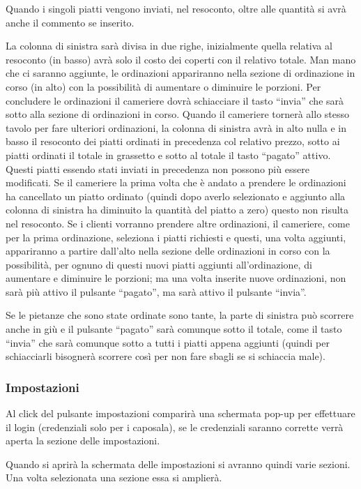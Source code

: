 \documentclass[12pt, letterpaper]{book}
\begin{document}
Quando i singoli piatti vengono inviati, nel resoconto, oltre alle quantità si avrà anche il commento se inserito.

La colonna di sinistra sarà divisa in due righe, inizialmente quella relativa al resoconto (in basso) avrà solo il costo dei coperti con il relativo totale. Man mano che ci saranno aggiunte, le ordinazioni appariranno nella sezione di ordinazione in corso (in alto) con la possibilità di aumentare o diminuire le porzioni. Per concludere le ordinazioni il cameriere dovrà schiacciare il tasto “invia” che sarà sotto alla sezione di ordinazioni in corso. Quando il cameriere tornerà allo stesso tavolo per fare ulteriori ordinazioni, la colonna di sinistra avrà in alto nulla e in basso il resoconto dei piatti ordinati in precedenza col relativo prezzo, sotto ai piatti ordinati il totale in grassetto e sotto al totale il tasto “pagato” attivo. Questi piatti essendo stati inviati in precedenza non possono più essere modificati. Se il cameriere la prima volta che è andato a prendere le ordinazioni ha cancellato un piatto ordinato (quindi dopo averlo selezionato e aggiunto alla colonna di sinistra ha diminuito la quantità del piatto a zero) questo non risulta nel resoconto. Se i clienti vorranno prendere altre ordinazioni, il cameriere, come per la prima ordinazione, seleziona i piatti richiesti e questi, una volta aggiunti, appariranno a partire dall'alto nella sezione delle ordinazioni in corso con la possibilità, per ognuno di questi nuovi piatti aggiunti all'ordinazione, di aumentare e diminuire le porzioni; ma una volta inserite nuove ordinazioni, non sarà più attivo il pulsante “pagato”, ma sarà attivo il pulsante “invia”.

Se le pietanze che sono state ordinate sono tante, la parte di sinistra può scorrere anche in giù e il pulsante “pagato” sarà comunque sotto il totale, come il tasto “invia” che sarà comunque sotto a tutti i piatti appena aggiunti (quindi per schiacciarli bisognerà scorrere così per non fare sbagli se si schiaccia male).
\subsubsection{Impostazioni}
Al click del pulsante impostazioni comparirà una schermata pop-up per effettuare il login (credenziali solo per i caposala), se le credenziali saranno corrette verrà aperta la sezione delle impostazioni.

Quando si aprirà la schermata delle impostazioni si avranno quindi varie sezioni. Una volta selezionata una sezione essa si amplierà.
\end{document}
